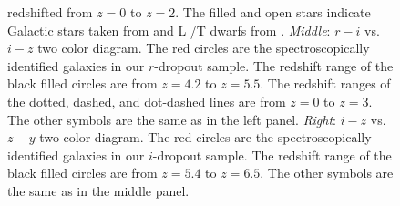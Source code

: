 \documentclass[]{pasj01}
\begin{document}
\begin{figure}
{\citep{1980ApJS...43..393C} redshifted from $z=0$ to $z=2$. 
The filled and open stars indicate 
Galactic stars taken from \citet{1983ApJS...52..121G}
and L /T dwarfs from \citet{2004AJ....127.3553K}. 
%
\textit{Middle}: $r - i$ vs. $i - z$ two color diagram. 
The red circles are the spectroscopically identified galaxies in our $r$-dropout sample. 
The redshift range of the black filled circles are from $z=4.2$ to $z=5.5$. 
The redshift ranges of the dotted, dashed, and dot-dashed lines are  from $z=0$ to $z=3$.
The other symbols are the same as in the left panel. 
% 
\textit{Right}: $i - z$ vs. $z - y$ two color diagram. 
The red circles are the spectroscopically identified galaxies in our $i$-dropout sample. 
The redshift range of the black filled circles are from $z=5.4$ to $z=6.5$.  
The other symbols are the same as in the middle panel. 
}\label{fig:two_color_diagram}
\end{figure}
\end{document}
